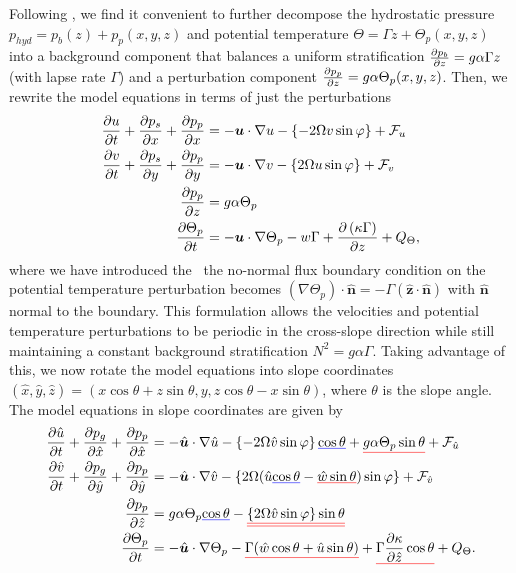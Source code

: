 \documentclass{article}
\def\mathunderline#1#2{\color{#1}\underline{{\color{black}#2}}\color{black}}
\begin{document}
Following \cite{Callies2018RestratificationEddies}, we find it convenient to further decompose the hydrostatic pressure $p_{hyd} = p_{b}(z) + p_{p}(x,y,z)$ and potential temperature $\Theta = \Gamma z + \Theta_{p}(x,y,z)$ into a background component that balances a uniform stratification $\pdv{p_{b}}{z} = g \alpha \Gamma z$ (with lapse rate $\Gamma$) and a perturbation component $\pdv{p_{p}}{z} = g \alpha \Theta_{p}(x,y,z)$. Then, we rewrite the model equations in terms of just the perturbations
\begin{align}
    \pdv{u}{t} + \pdv{p_{s}}{x} + \pdv{p_{p}}{x} &= - \bm{u} \cdot \nabla u -\left\{ -2\Omega v \sin{\varphi} \right\} + \mathcal{F}_{u}
    \\
    \pdv{v}{t} + \pdv{p_{s}}{y} + \pdv{p_{p}}{y} &= - \bm{u} \cdot \nabla v -\left\{2\Omega u \sin{\varphi} \right\} + \mathcal{F}_{v}
    \\
    \pdv{p_{p}}{z} &= g\alpha \Theta_{p}
    \\
    \pdv{\Theta_{p}}{t} &= - \bm{u} \cdot \nabla \Theta_{p} - w\Gamma + \pdv{\left( \kappa \Gamma \right)}{z} + Q_{\Theta},
\end{align}
where we have introduced the \ the no-normal flux boundary condition on the potential temperature perturbation becomes $( \nabla \Theta_{p}) \cdot \hat{\bm{n}} = - \Gamma (\hat{\bm{z}} \cdot \hat{\bm{n}})$ with $\hat{\bm{n}}$ normal to the boundary. This formulation allows the velocities and potential temperature perturbations to be periodic in the cross-slope direction while still maintaining a constant background stratification $N^{2} = g \alpha \Gamma$. Taking advantage of this, we now rotate the model equations into slope coordinates $(\hat{x},\hat{y},\hat{z}) = (x\cos{\theta} + z\sin{\theta}, y, z\cos{\theta} - x\sin{\theta})$, where $\theta$ is the slope angle. The model equations in slope coordinates are given by
\begin{align}
    \pdv{\hat{u}}{t} + \pdv{p_{g}}{\hat{x}} + \pdv{p_{p}}{\hat{x}} &= - \hat{\bm{u}} \cdot \nabla \hat{u} - \left\{-2\Omega \hat{v} \sin{\varphi} \right\}\mathunderline{blue}{\cos{\theta}} + \mathunderline{red}{g\alpha \Theta_{p} \sin{\theta}} + \mathcal{F}_{\hat{u}}
    \label{mitgcmrotated1}
    \\
    \pdv{\hat{v}}{t} + \pdv{p_{g}}{\hat{y}} + \pdv{p_{p}}{\hat{y}} &= - \hat{\bm{u}} \cdot \nabla \hat{v} -\left\{2\Omega (\hat{u} \mathunderline{blue}{\cos{\theta}} - \mathunderline{red}{\hat{w}\sin{\theta}}) \sin{\varphi} \right\} + \mathcal{F}_{\hat{v}}
    \\
    \pdv{p_{p}}{\hat{z}} &= g\alpha \Theta_{p}\mathunderline{blue}{\cos{\theta}} - \mathunderline{red}{\mathunderline{red}{\left\{ 2\Omega \hat{v} \sin{\varphi} \right\} \sin{\theta}}}
    \\
    \pdv{\Theta_{p}}{t} &= - \hat{\bm{u}} \cdot \nabla \Theta_{p} - 
    \mathunderline{red}{\Gamma (\hat{w}\cos{\theta} + \hat{u}\sin{\theta})} + 
    \mathunderline{red}{\Gamma \pdv{\kappa}{\hat{z}}\cos{\theta}}  + Q_{\Theta}.\label{mitgcmrotated2}
\end{align}
\end{document}

